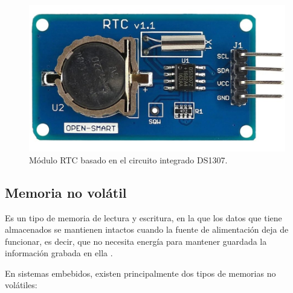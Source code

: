 \begin{figure}[h]
	\centering
	\includegraphics[scale=0.2]{./Figures/rtc.jpg}
	\caption{Módulo RTC basado en el circuito integrado DS1307\protect\footnotemark.}
	\label{fig:cuadradoAzul}
\end{figure}


\subsection{Memoria no volátil}

Es un tipo de memoria de lectura y escritura, en la que los datos que tiene almacenados se mantienen intactos cuando la fuente de alimentación deja de funcionar, es decir, que no necesita energía para mantener guardada la información grabada en ella \citep{BOOK:3}.

En sistemas embebidos, existen principalmente dos tipos de memorias no volátiles:

